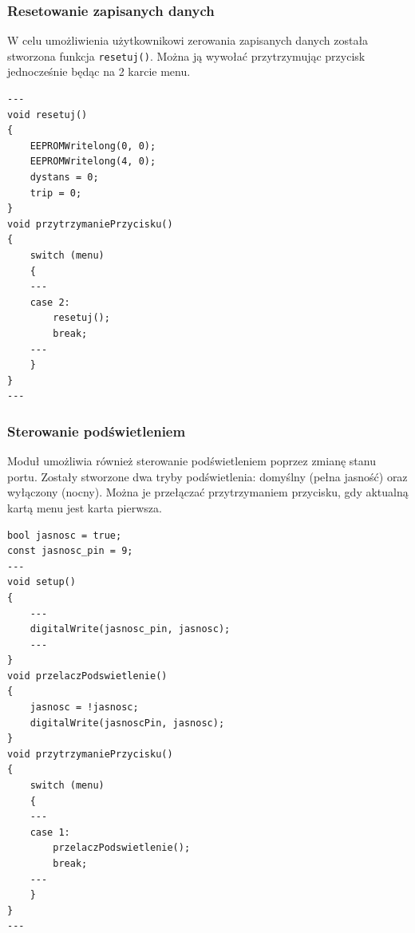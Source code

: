 \subsubsection{Resetowanie zapisanych danych}
W celu umożliwienia użytkownikowi zerowania zapisanych danych została stworzona funkcja \texttt{resetuj()}. Można ją wywołać przytrzymując przycisk jednocześnie będąc na 2 karcie menu.

\begin{lstlisting}[label=list:menu_card4,caption=Resetowanie zapisanych danych,
basicstyle=\footnotesize\ttfamily]
---
void resetuj()
{
    EEPROMWritelong(0, 0);
    EEPROMWritelong(4, 0);
    dystans = 0;
    trip = 0;
}
void przytrzymaniePrzycisku()
{
    switch (menu)
    {
    ---
    case 2:
        resetuj();
        break;
    ---
    }
}
---
\end{lstlisting}

\subsubsection{Sterowanie podświetleniem}
Moduł umożliwia również sterowanie podświetleniem poprzez zmianę stanu portu. Zostały stworzone dwa tryby podświetlenia: domyślny (pełna jasność) oraz wyłączony (nocny). Można je przełączać przytrzymaniem przycisku, gdy aktualną kartą menu jest karta pierwsza.

\begin{lstlisting}[label=list:hold_button_brightness,caption=Resetowanie zapisanych danych,
basicstyle=\footnotesize\ttfamily]
bool jasnosc = true;
const jasnosc_pin = 9;
---
void setup()
{
    ---
    digitalWrite(jasnosc_pin, jasnosc);
    ---
}
void przelaczPodswietlenie()
{
    jasnosc = !jasnosc;
    digitalWrite(jasnoscPin, jasnosc);
}
void przytrzymaniePrzycisku()
{
    switch (menu)
    {
    ---
    case 1:
        przelaczPodswietlenie();
        break;
    ---
    }
}
---
\end{lstlisting}